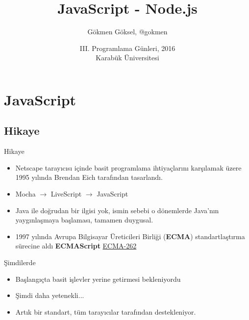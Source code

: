 \documentclass[xcolor=dvipsnames]{beamer}
\title{JavaScript - Node.js}
\author{Gökmen Göksel, @gokmen}
\institute[Koding]{Yazılım Mühendisi\\Koding}
\date{III. Programlama Günleri, 2016\\Karabük Üniversitesi}
\begin{document}
\begin{frame}
    \titlepage
\end{frame}
\section{JavaScript}

\begin{frame}
\centering{}
\end{frame}

\subsection{Hikaye}
\begin{frame}{Hikaye}
\begin{itemize}
    \item {
        Netscape tarayıcısı içinde basit programlama
        ihtiyaçlarını karşılamak üzere 1995 yılında
        Brendan Eich tarafından tasarlandı.
        \pause
    }
    \item {
        Mocha $\rightarrow$ LiveScript $\rightarrow$ JavaScript
        \pause
    }
    \item {
        Java ile doğrudan bir ilgisi yok, ismin sebebi o dönemlerde
        Java'nın yaygınlaşmaya başlaması, tamamen duygusal.
        \pause
    }
    \item {
        1997 yılında Avrupa Bilgisayar Üreticileri Birliği (\textbf{ECMA})
        standartlaştırma sürecine aldı \textbf{ECMAScript}
        \href{http://www.ecma-international.org/publications/files/ECMA-ST/Ecma-262.pdf}{ECMA-262}
    }
\end{itemize}
\end{frame}
\begin{frame}{Şimdilerde}
\begin{itemize}
    \item<1-> {
        Başlangıçta basit işlevler yerine getirmesi bekleniyordu
    }
    \item<3-> {
        Şimdi daha yetenekli...
    }
    \item<5-> {
        Artık bir standart, tüm tarayıcılar tarafından destekleniyor.
    }
\end{itemize}
\end{frame}
\end{document}
